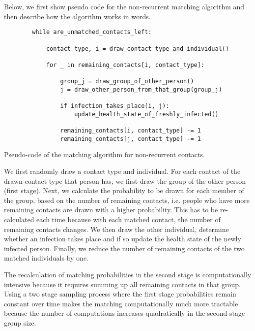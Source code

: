Below, we first show pseudo code for the non-recurrent matching algorithm and then
describe how the algorithm works in words.

\begin{listing}
    \label{code:matching}
    \begin{verbatim}
        while are_unmatched_contacts_left:

            contact_type, i = draw_contact_type_and_individual()

            for _ in remaining_contacts[i, contact_type]:

                group_j = draw_group_of_other_person()
                j = draw_other_person_from_that_group(group_j)

                if infection_takes_place(i, j):
                    update_health_state_of_freshly_infected()

                remaining_contacts[i, contact_type] -= 1
                remaining_contacts[j, contact_type] -= 1
    \end{verbatim}
    \caption{Pseudo-code of the matching algorithm for non-recurrent contacts.}
\end{listing}

We first randomly draw a contact type and individual. For each contact of the drawn
contact type that person has, we first draw the group of the other person (first stage).
Next, we calculate the probability to be drawn for each member of the group, based on
the number of remaining contacts, i.e. people who have more remaining contacts are drawn
with a higher probability. This has to be re-calculated each time because with each
matched contact, the number of remaining contacts changes. We then draw the other
individual, determine whether an infection takes place and if so update the health state
of the newly infected person. Finally, we reduce the number of remaining contacts of the
two matched individuals by one.

The recalculation of matching probabilities in the second stage is computationally
intensive because it requires summing up all remaining contacts in that group. Using a
two stage sampling process where the first stage probabilities remain constant over time
makes the matching computationally much more tractable because the number of
computations increases quadratically in the second stage group size.
